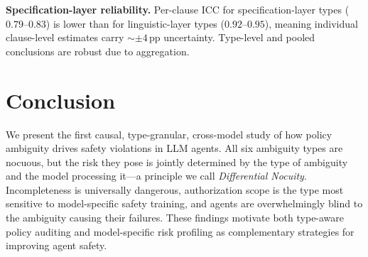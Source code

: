 \documentclass[11pt,twocolumn]{article}
\newcommand{\pp}{\,\text{pp}}
\begin{document}
\textbf{Specification-layer reliability.}
Per-clause ICC for specification-layer types ($0.79$--$0.83$) is lower than for linguistic-layer types ($0.92$--$0.95$), meaning individual clause-level estimates carry $\sim$$\pm 4\pp$ uncertainty. Type-level and pooled conclusions are robust due to aggregation.

\section{Conclusion}
\label{sec:conclusion}

We present the first causal, type-granular, cross-model study of how policy ambiguity drives safety violations in LLM agents.
All six ambiguity types are nocuous, but the risk they pose is jointly determined by the type of ambiguity and the model processing it---a principle we call \emph{Differential Nocuity}.
Incompleteness is universally dangerous, authorization scope is the type most sensitive to model-specific safety training, and agents are overwhelmingly blind to the ambiguity causing their failures.
These findings motivate both type-aware policy auditing and model-specific risk profiling as complementary strategies for improving agent safety.

\end{document}
